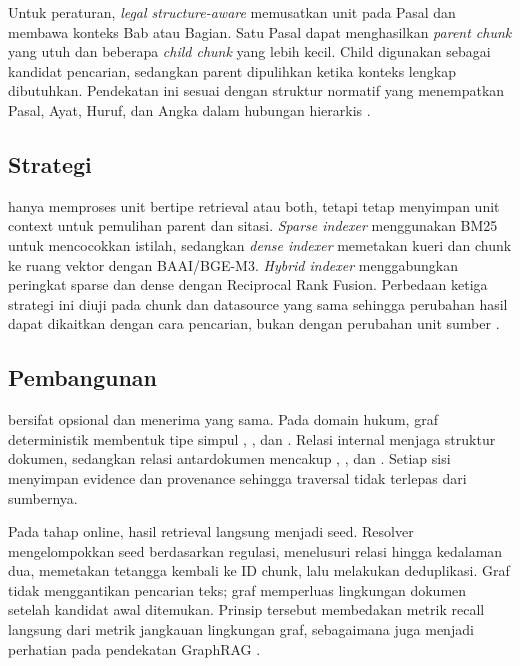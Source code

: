 Untuk peraturan, \textit{legal structure-aware} memusatkan unit pada Pasal dan membawa konteks Bab atau Bagian. Satu Pasal dapat menghasilkan \textit{parent chunk} yang utuh dan beberapa \textit{child chunk} yang lebih kecil. Child digunakan sebagai kandidat pencarian, sedangkan parent dipulihkan ketika konteks lengkap dibutuhkan. Pendekatan ini sesuai dengan struktur normatif yang menempatkan Pasal, Ayat, Huruf, dan Angka dalam hubungan hierarkis \cite{uuPembentukanPeraturan2011,akarajaradwongNitiBenchComprehensiveStudy2025}.

\subsection{Strategi \indexer{}}

\indexer{} hanya memproses unit bertipe retrieval atau both, tetapi tetap menyimpan unit context untuk pemulihan parent dan sitasi. \textit{Sparse indexer} menggunakan BM25 untuk mencocokkan istilah, sedangkan \textit{dense indexer} memetakan kueri dan chunk ke ruang vektor dengan BAAI/BGE-M3. \textit{Hybrid indexer} menggabungkan peringkat sparse dan dense dengan Reciprocal Rank Fusion. Perbedaan ketiga strategi ini diuji pada chunk dan datasource yang sama sehingga perubahan hasil dapat dikaitkan dengan cara pencarian, bukan dengan perubahan unit sumber \cite{robertsonProbabilisticRelevanceFramework2009,karpukhinDensePassageRetrieval2020,chenM3Embedding2024}.

\subsection{Pembangunan \kg{}}

\kg{} bersifat opsional dan menerima  yang sama. Pada domain hukum, graf deterministik membentuk tipe simpul , , dan . Relasi internal  menjaga struktur dokumen, sedangkan relasi antardokumen mencakup , , dan . Setiap sisi menyimpan evidence dan provenance sehingga traversal tidak terlepas dari sumbernya.

Pada tahap online, hasil retrieval langsung menjadi seed. Resolver mengelompokkan seed berdasarkan regulasi, menelusuri relasi hingga kedalaman dua, memetakan tetangga kembali ke ID chunk, lalu melakukan deduplikasi. Graf tidak menggantikan pencarian teks; graf memperluas lingkungan dokumen setelah kandidat awal ditemukan. Prinsip tersebut membedakan metrik recall langsung dari metrik jangkauan lingkungan graf, sebagaimana juga menjadi perhatian pada pendekatan GraphRAG \cite{hanRetrievalAugmentedGenerationGraphs2025}.
